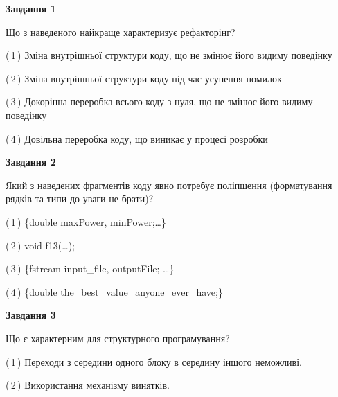 \documentclass[10pt, ukrainian]{article}
\begin{document}
{
\begin {large}
{\begin {center}\textbf{Завдання 1}\end {center}}\par
Що з наведеного найкраще характеризує рефакторінг?\par
\vspace{2mm}



(\,1\,) Зміна внутрішньої структури коду, що не змінює його видиму поведінку%



(\,2\,) Зміна внутрішньої структури коду під час усунення помилок%



(\,3\,) Докорінна переробка всього коду з нуля,  що не змінює його видиму поведінку%



(\,4\,) Довільна переробка коду, що виникає у процесі розробки%


{\begin {center}\textbf{Завдання 2}\end {center}}\par
Який з наведених фрагментів коду явно потребує поліпшення (форматування рядків та типи до уваги не брати)?\par
\vspace{2mm}



(\,1\,) \{double maxPower, minPower;…\} %



(\,2\,) void f13(…);%



(\,3\,) \{fstream input\_file, outputFile; …\}%



(\,4\,) \{double the\_best\_value\_anyone\_ever\_have;\} %


{\begin {center}\textbf{Завдання 3}\end {center}}\par
Що є характерним для структурного програмування?\par
\vspace{2mm}



(\,1\,) Переходи з середини одного блоку в середину іншого неможливі. %



(\,2\,) Використання механізму винятків. %




\end{large}}
\end{document}
